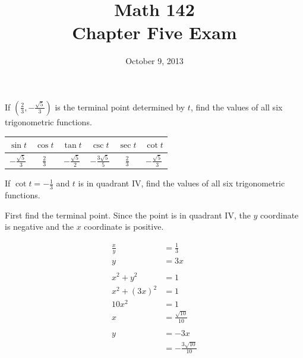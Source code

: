 \documentclass[fleqn,addpoints]{exam}
\author{}
\date{October 9, 2013}
\title{Math 142 \\ Chapter Five Exam}
\begin{document}
  \maketitle

  \begin{center}
    \gradetable[h][pages]
  \end{center}

  \begin{questions}
    
    \question[6]
      If $\left( \frac{2}{3}, - \frac{\sqrt{5}}{3} \right)$ is the terminal point determined by $t$, find the values of
      all six trigonometric functions. 
      
      \begin{solution}
        \begin{tabular}[H]{cccccc}
          \toprule
          $\sin t$               & $\cos t$      & $\tan t$               & $\csc t$                 & $\sec t$      & $\cot t$ \\
          \midrule
          $- \frac{\sqrt{5}}{3}$ & $\frac{2}{3}$ & $- \frac{\sqrt{5}}{2}$ & $- \frac{3 \sqrt{5}}{5}$ & $\frac{2}{3}$ & $- \frac{\sqrt{5}}{3}$ \\
          \bottomrule
        \end{tabular}
      \end{solution}

    \question[8]
      If $\cot t = - \frac{1}{3}$ and $t$ is in quadrant IV, find the values of all six trigonometric functions.

      \begin{solution}
        First find the terminal point.  Since the point is in quadrant IV, the $y$ coordinate is negative and the $x$
        coordinate is positive.

        \begin{align*}
          \frac{x}{y}  & = \frac{1}{3} \\
          y            & = 3x \\
          \\
          x^2 + y^2    & = 1 \\
          x^2 + (3x)^2 & = 1 \\
          10 x^2       & = 1 \\
          x            & = \frac{\sqrt{10}}{10} \\
          \\
          y            & = -3x \\
                       & = -\frac{3 \sqrt{10}}{10}  \\
        \end{align*}


\end{solution}
\end{questions}
\end{document}
